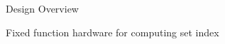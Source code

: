\begin{figure}
  \caption{Design Overview}
  \label{figure:design_overview}
\end{figure}


\begin{figure}
  \caption{Fixed function hardware for computing set index}
  \label{figure:fixed_func_hw}
\end{figure}

